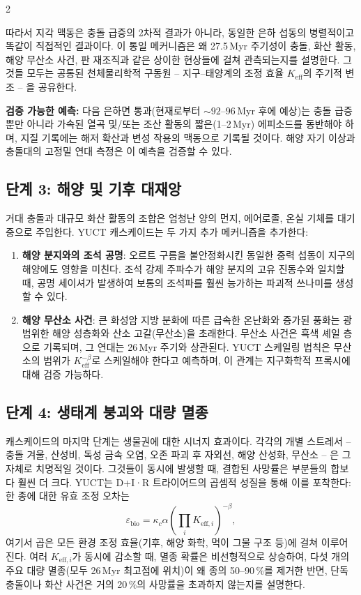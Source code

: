 \documentclass[12pt,a4paper]{article}
\begin{document}
	\begin{multicols}{2}
		
		따라서 지각 맥동은 충돌 급증의 2차적 결과가 아니라, 동일한 은하 섭동의 병렬적이고 똑같이 직접적인 결과이다. 이 통일 메커니즘은 왜 27.5 Myr 주기성이 충돌, 화산 활동, 해양 무산소 사건, 판 재조직과 같은 상이한 현상들에 걸쳐 관측되는지를 설명한다. 그것들 모두는 공통된 천체물리학적 구동원 – 지구–태양계의 조정 효율 \(K_{\mathrm{eff}}\)의 주기적 변조 – 을 공유한다.
		
		\vspace{0.2cm}
		\noindent
		\textbf{검증 가능한 예측:} 다음 은하면 통과(현재로부터 \(\sim 92\)–\(96\) Myr 후에 예상)는 충돌 급증뿐만 아니라 가속된 열곡 및/또는 조산 활동의 짧은(1–2 Myr) 에피소드를 동반해야 하며, 지질 기록에는 해저 확산과 변성 작용의 맥동으로 기록될 것이다. 해양 자기 이상과 충돌대의 고정밀 연대 측정은 이 예측을 검증할 수 있다.
		
		\subsection{단계 3: 해양 및 기후 대재앙}
		거대 충돌과 대규모 화산 활동의 조합은 엄청난 양의 먼지, 에어로졸, 온실 기체를 대기 중으로 주입한다. YUCT 캐스케이드는 두 가지 추가 메커니즘을 추가한다:
		\begin{enumerate}
			\item \textbf{해양 분지와의 조석 공명}: 오르트 구름을 불안정화시킨 동일한 중력 섭동이 지구의 해양에도 영향을 미친다. 조석 강제 주파수가 해양 분지의 고유 진동수와 일치할 때, 공명 세이셔가 발생하여 보통의 조석파를 훨씬 능가하는 파괴적 쓰나미를 생성할 수 있다.
			\item \textbf{해양 무산소 사건}: 큰 화성암 지방 분화에 따른 급속한 온난화와 증가된 풍화는 광범위한 해양 성층화와 산소 고갈(무산소)을 초래한다. 무산소 사건은 흑색 셰일 층으로 기록되며, 그 연대는 26 Myr 주기와 상관된다. YUCT 스케일링 법칙은 무산소의 범위가 \(K_{\mathrm{eff}}^{-\beta}\)로 스케일해야 한다고 예측하며, 이 관계는 지구화학적 프록시에 대해 검증 가능하다.
		\end{enumerate}
		
		\subsection{단계 4: 생태계 붕괴와 대량 멸종}
		캐스케이드의 마지막 단계는 생물권에 대한 시너지 효과이다. 각각의 개별 스트레서 – 충돌 겨울, 산성비, 독성 금속 오염, 오존 파괴 후 자외선, 해양 산성화, 무산소 – 은 그 자체로 치명적일 것이다. 그것들이 동시에 발생할 때, 결합된 사망률은 부분들의 합보다 훨씬 더 크다. YUCT는 D+I·R 트라이어드의 곱셈적 성질을 통해 이를 포착한다: 한 종에 대한 유효 조정 오차는
		\[
		\varepsilon_{\text{bio}} = \kappa_c \alpha \left( \prod_{i} K_{\mathrm{eff},i} \right)^{-\beta},
		\]
		여기서 곱은 모든 환경 조정 효율(기후, 해양 화학, 먹이 그물 구조 등)에 걸쳐 이루어진다. 여러 \(K_{\mathrm{eff},i}\)가 동시에 감소할 때, 멸종 확률은 비선형적으로 상승하여, 다섯 개의 주요 대량 멸종(모두 26 Myr 최고점에 위치)이 왜 종의 50–90 \%를 제거한 반면, 단독 충돌이나 화산 사건은 거의 20 \%의 사망률을 초과하지 않는지를 설명한다.
		
	\end{multicols}
	
\end{document}
